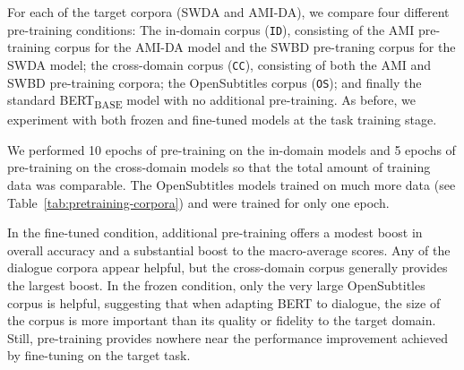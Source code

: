 \documentclass[11pt,a4paper]{article}
\begin{document}
For each of the target corpora (SWDA and AMI-DA), we compare four different pre-training conditions: 
The in-domain corpus (\texttt{ID}), consisting of the AMI pre-training corpus for the AMI-DA model and the SWBD pre-traning corpus for the SWDA model; 
the cross-domain corpus (\texttt{CC}), consisting of both the AMI and SWBD pre-training corpora; 
the OpenSubtitles corpus (\texttt{OS});
and finally the standard BERT\textsubscript{BASE} model with no additional pre-training.
As before, we experiment with both frozen and fine-tuned models at the task training stage.

We performed 10 epochs of pre-training on the in-domain models and 5 epochs of pre-training on the cross-domain models so that the total amount of training data was comparable. The OpenSubtitles models trained on much more data (see Table~\ref{tab:pretraining-corpora}) and were trained for only one epoch.

In the fine-tuned condition, additional pre-training offers a modest boost in overall accuracy and a substantial boost to the macro-average scores.
Any of the dialogue corpora appear helpful, but the cross-domain corpus generally provides the largest boost.
In the frozen condition, only the very large OpenSubtitles corpus is helpful, suggesting that when adapting BERT to dialogue, the size of the corpus is more important than its quality or fidelity to the target domain.
Still, pre-training provides nowhere near the performance improvement achieved by fine-tuning on the target task.
\end{document}
